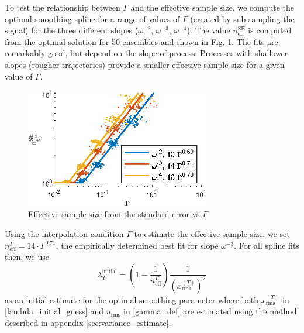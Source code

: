 \documentclass{ametsoc}
\begin{document}
To test the relationship between $\Gamma$ and the effective sample size, we compute the optimal smoothing spline for a range of values of $\Gamma$ (created by sub-sampling the signal) for the three different slopes ($\omega^{-2}$, $\omega^{-3}$, $\omega^{-4}$). The value $n_{\textrm{eff}}^\textrm{SE}$ is computed from the optimal solution for 50 ensembles and shown in Fig. \ref{dofVsGamma}. The fits are remarkably good, but depend on the slope of process. Processes with shallower slopes (rougher trajectories) provide a smaller effective sample size for a given value of $\Gamma$. 

\begin{figure}
  \centerline{\includegraphics[width=19pc,angle=0]{dofVsGamma.eps}}
  \caption{Effective sample size from the standard error vs $\Gamma$}
  \label{dofVsGamma}
\end{figure}

Using the interpolation condition $\Gamma$ to estimate the effective sample size, we set $n_{\textrm{eff}}^\Gamma = 14 \cdot \Gamma^{0.71}$, the empirically determined best fit for slope $\omega^{-3}$.  For all spline fits then, we use
\begin{equation}
\label{lambda_initial_guess}
\lambda^{\textrm{initial}}_T = \left( 1 -\frac{1}{n_{\textrm{eff}}^\Gamma}\right) \frac{1}{ \left(x^{(T)}_{\textrm{rms}}\right)^2  }
\end{equation}
as an initial estimate for the optimal smoothing parameter where both $x^{(T)}_{\textrm{rms}}$ in \eqref{lambda_initial_guess} and $u_\textrm{rms}$ in \eqref{gamma_def} are estimated using the method described in appendix \ref{sec:variance_estimate}.
\end{document}
